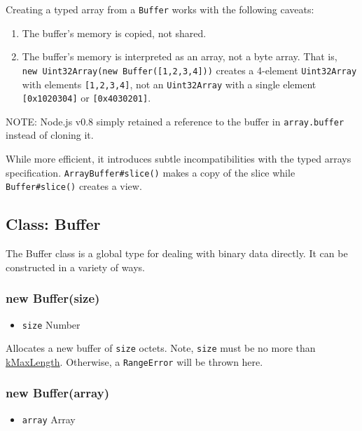 Creating a typed array from a \texttt{Buffer} works with the following
caveats:

\begin{enumerate}
\def\labelenumi{\arabic{enumi}.}
\item
  The buffer's memory is copied, not shared.
\item
  The buffer's memory is interpreted as an array, not a byte array. That
  is, \texttt{new\ Uint32Array(new\ Buffer({[}1,2,3,4{]}))} creates a
  4-element \texttt{Uint32Array} with elements \texttt{{[}1,2,3,4{]}},
  not an \texttt{Uint32Array} with a single element
  \texttt{{[}0x1020304{]}} or \texttt{{[}0x4030201{]}}.
\end{enumerate}

NOTE: Node.js v0.8 simply retained a reference to the buffer in
\texttt{array.buffer} instead of cloning it.

While more efficient, it introduces subtle incompatibilities with the
typed arrays specification. \texttt{ArrayBuffer\#slice()} makes a copy
of the slice while \texttt{Buffer\#slice()} creates a view.

\subsection{Class: Buffer}\label{class-buffer}

The Buffer class is a global type for dealing with binary data directly.
It can be constructed in a variety of ways.

\subsubsection{new Buffer(size)}\label{new-buffersize}

\begin{itemize}
\itemsep1pt\parskip0pt
\item
  \texttt{size} Number
\end{itemize}

Allocates a new buffer of \texttt{size} octets. Note, \texttt{size} must
be no more than
\href{smalloc.html\#smalloc_smalloc_kmaxlength}{kMaxLength}. Otherwise,
a \texttt{RangeError} will be thrown here.

\subsubsection{new Buffer(array)}\label{new-bufferarray}

\begin{itemize}
\itemsep1pt\parskip0pt
\item
  \texttt{array} Array
\end{itemize}

